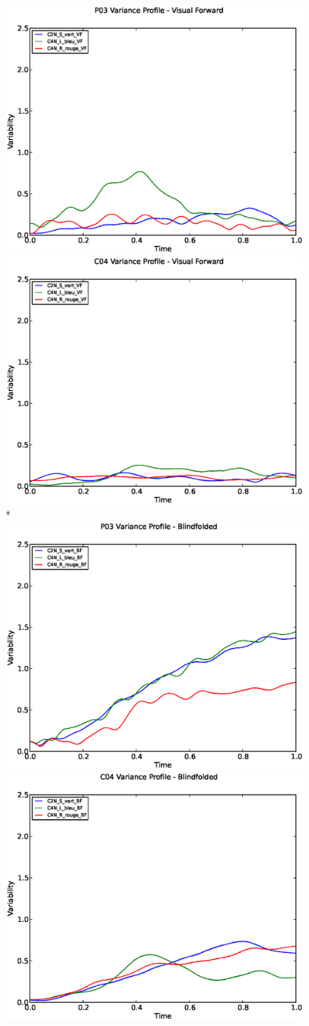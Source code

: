\documentclass[a4page,landscape,twocolumn,10pt]{article}
\begin{document}
\begin{figure}
  \centering
  \includegraphics[width=0.45\linewidth]{P03_Variability_profile_VF.eps}
  \includegraphics[width=0.45\linewidth]{C04_Variability_profile_VF.eps}
  \\*
  \includegraphics[width=0.45\linewidth]{P03_Variability_profile_BF.eps}
  \includegraphics[width=0.45\linewidth]{C04_Variability_profile_BF.eps}
\end{figure}

\clearpage
\end{document}
